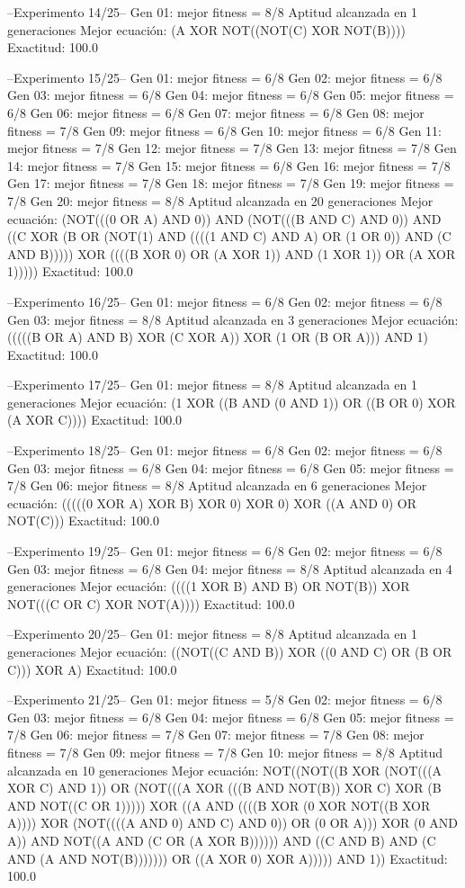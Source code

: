 --Experimento 
 14/25--
Gen 01: mejor fitness = 8/8
Aptitud alcanzada en 1 generaciones
Mejor ecuación: (A XOR NOT((NOT(C) XOR NOT(B))))
 Exactitud: 100.0%

--Experimento 
 15/25--
Gen 01: mejor fitness = 6/8
Gen 02: mejor fitness = 6/8
Gen 03: mejor fitness = 6/8
Gen 04: mejor fitness = 6/8
Gen 05: mejor fitness = 6/8
Gen 06: mejor fitness = 6/8
Gen 07: mejor fitness = 6/8
Gen 08: mejor fitness = 7/8
Gen 09: mejor fitness = 6/8
Gen 10: mejor fitness = 6/8
Gen 11: mejor fitness = 7/8
Gen 12: mejor fitness = 7/8
Gen 13: mejor fitness = 7/8
Gen 14: mejor fitness = 7/8
Gen 15: mejor fitness = 6/8
Gen 16: mejor fitness = 7/8
Gen 17: mejor fitness = 7/8
Gen 18: mejor fitness = 7/8
Gen 19: mejor fitness = 7/8
Gen 20: mejor fitness = 8/8
Aptitud alcanzada en 20 generaciones
Mejor ecuación: (NOT(((0 OR A) AND 0)) AND (NOT(((B AND C) AND 0)) AND ((C XOR (B OR (NOT(1) AND ((((1 AND C) AND A) OR (1 OR 0)) AND (C AND B))))) XOR ((((B XOR 0) OR (A XOR 1)) AND (1 XOR 1)) OR (A XOR 1)))))
 Exactitud: 100.0%

--Experimento 
 16/25--
Gen 01: mejor fitness = 6/8
Gen 02: mejor fitness = 6/8
Gen 03: mejor fitness = 8/8
Aptitud alcanzada en 3 generaciones
Mejor ecuación: (((((B OR A) AND B) XOR (C XOR A)) XOR (1 OR (B OR A))) AND 1)
 Exactitud: 100.0%

--Experimento 
 17/25--
Gen 01: mejor fitness = 8/8
Aptitud alcanzada en 1 generaciones
Mejor ecuación: (1 XOR ((B AND (0 AND 1)) OR ((B OR 0) XOR (A XOR C))))
 Exactitud: 100.0%

--Experimento 
 18/25--
Gen 01: mejor fitness = 6/8
Gen 02: mejor fitness = 6/8
Gen 03: mejor fitness = 6/8
Gen 04: mejor fitness = 6/8
Gen 05: mejor fitness = 7/8
Gen 06: mejor fitness = 8/8
Aptitud alcanzada en 6 generaciones
Mejor ecuación: (((((0 XOR A) XOR B) XOR 0) XOR 0) XOR ((A AND 0) OR NOT(C)))
 Exactitud: 100.0%

--Experimento 
 19/25--
Gen 01: mejor fitness = 6/8
Gen 02: mejor fitness = 6/8
Gen 03: mejor fitness = 6/8
Gen 04: mejor fitness = 8/8
Aptitud alcanzada en 4 generaciones
Mejor ecuación: ((((1 XOR B) AND B) OR NOT(B)) XOR NOT(((C OR C) XOR NOT(A))))
 Exactitud: 100.0%

--Experimento 
 20/25--
Gen 01: mejor fitness = 8/8
Aptitud alcanzada en 1 generaciones
Mejor ecuación: ((NOT((C AND B)) XOR ((0 AND C) OR (B OR C))) XOR A)
 Exactitud: 100.0%

--Experimento 
 21/25--
Gen 01: mejor fitness = 5/8
Gen 02: mejor fitness = 6/8
Gen 03: mejor fitness = 6/8
Gen 04: mejor fitness = 6/8
Gen 05: mejor fitness = 7/8
Gen 06: mejor fitness = 7/8
Gen 07: mejor fitness = 7/8
Gen 08: mejor fitness = 7/8
Gen 09: mejor fitness = 7/8
Gen 10: mejor fitness = 8/8
Aptitud alcanzada en 10 generaciones
Mejor ecuación: NOT((NOT((B XOR (NOT(((A XOR C) AND 1)) OR (NOT(((A XOR (((B AND NOT(B)) XOR C) XOR (B AND NOT((C OR 1))))) XOR ((A AND ((((B XOR (0 XOR NOT((B XOR A)))) XOR (NOT((((A AND 0) AND C) AND 0)) OR (0 OR A))) XOR (0 AND A)) AND NOT((A AND (C OR (A XOR B)))))) AND ((C AND B) AND (C AND (A AND NOT(B))))))) OR ((A XOR 0) XOR A))))) AND 1))
 Exactitud: 100.0%

